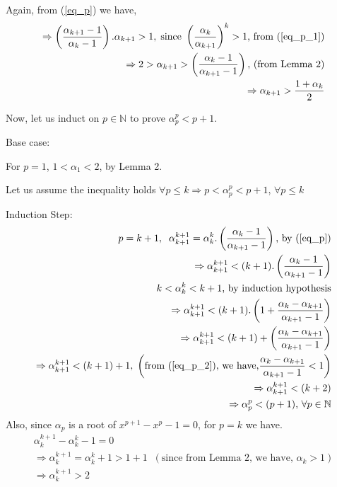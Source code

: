 \documentclass{ijcsa}
\begin{document}
\par Again, from (\ref{eq_p}) we have,
\begin{eqnarray}
\label{eq_p_2}
\Rightarrow \left(\frac{\alpha_{k+1}-1}{\alpha_{k}-1}\right).\alpha_{k+1}>1,
\; \mbox{since } \left(\frac{\alpha_{k}}{\alpha_{k+1}}\right)^k>1 \mbox{, from (\ref{eq_p_1})} \nonumber \\
\Rightarrow 2 > \alpha_{k+1} > \left(\frac{\alpha_{k}-1}{\alpha_{k+1}-1}\right) \mbox{, (from Lemma 2)} \nonumber \\
\Rightarrow \alpha_{k+1} > \frac{1+\alpha_{k}}{2}
\end{eqnarray}
\par Now, let us induct on $p \in \mathbb{N}$ to prove $\alpha_{p}^{p}<p+1$.
\par Base case: 
\par For $p=1$, $1<\alpha_{1}<2$, by Lemma 2.
\par Let us assume the inequality holds $\forall{p}\leq k \Rightarrow p<\alpha_{p}^{p}<p+1$, $\forall{p}\leq k$ 
\par Induction Step:
\begin{eqnarray}
	\label{eq_p_3}
	p=k+1, \;\; \alpha_{k+1}^{k+1}=\alpha_{k}^{k}.\left(\frac{\alpha_{k}-1}{\alpha_{k+1}-1}\right) 
	\mbox{, by (\ref{eq_p})} \nonumber \\
	\Rightarrow \alpha_{k+1}^{k+1}<(k+1).\left(\frac{\alpha_{k}-1}{\alpha_{k+1}-1}\right) \nonumber \\
	k<\alpha_{k}^{k}<k+1 \mbox{, by induction hypothesis} 					\nonumber \\
	\Rightarrow \alpha_{k+1}^{k+1}<(k+1).\left(1+\frac{\alpha_{k}-\alpha_{k+1}}{\alpha_{k+1}-1}\right) \nonumber \\
	\Rightarrow \alpha_{k+1}^{k+1}<(k+1)+\left(\frac{\alpha_{k}-\alpha_{k+1}}{\alpha_{k+1}-1}\right) \nonumber \\
	\Rightarrow \alpha_{k+1}^{k+1}<(k+1)+1, \; \left(\mbox{from (\ref{eq_p_2}), we have,}
	\frac{\alpha_{k}-\alpha_{k+1}}{\alpha_{k+1}-1}<1\right)	\nonumber \\
	\Rightarrow \alpha_{k+1}^{k+1}<(k+2) \nonumber \\
	\Rightarrow \alpha_{p}^{p}<(p+1) \mbox{, } \forall{p} \in \mathbb{N} 
\end{eqnarray}
Also, since $\alpha_{p}$ is a root of $x^{p+1}-x^{p}-1=0$, for $p=k$ we have.
\begin{eqnarray}
	\label{eq_p_4}
	\alpha_{k}^{k+1}-\alpha_{k}^{k}-1=0  \nonumber \\
	\Rightarrow \alpha_{k}^{k+1} = \alpha_{k}^{k} + 1 > 1 + 1\;\;(\mbox{since from Lemma 2, we have, }\alpha_{k}>1) \nonumber \\
	\Rightarrow \alpha_{k}^{k+1} > 2
\end{eqnarray}
\end{document}

